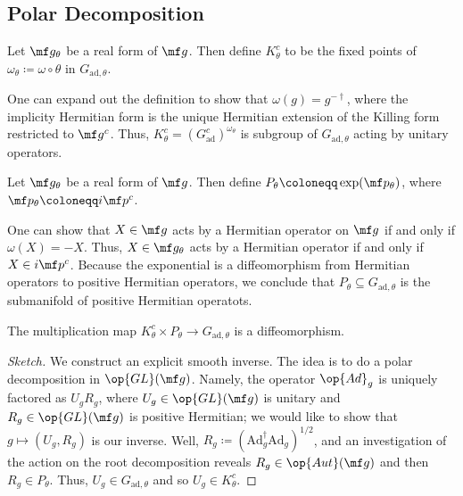 \documentclass{article}
\begin{document}
\subsection{Polar Decomposition}
\begin{definition}
	Let $\mf g_\theta$ be a real form of $\mf g$. Then define $K^c_\theta$ to be the fixed points of $\omega_\theta\coloneqq\omega\circ\theta$ in $G_{\mathrm{ad},\theta}$.
\end{definition}
\begin{remark}
	One can expand out the definition to show that $\omega(g)=g^{-\dagger}$, where the implicity Hermitian form is the unique Hermitian extension of the Killing form restricted to $\mf g^c$. Thus, $K^c_\theta=(G_{\mathrm{ad}}^c)^{\omega_\theta}$ is subgroup of $G_{\mathrm{ad},\theta}$ acting by unitary operators.
\end{remark}
\begin{definition}
	Let $\mf g_\theta$ be a real form of $\mf g$. Then define $P_\theta\coloneqq\exp(\mf p_\theta)$, where $\mf p_\theta\coloneqq i\mf p^c$.
\end{definition}
\begin{remark}
	One can show that $X\in\mf g$ acts by a Hermitian operator on $\mf g$ if and only if $\omega(X)=-X$. Thus, $X\in\mf g_\theta$ acts by a Hermitian operator if and only if $X\in i\mf p^c$. Because the exponential is a diffeomorphism from Hermitian operators to positive Hermitian operators, we conclude that $P_\theta\subseteq G_{\mathrm{ad},\theta}$ is the submanifold of positive Hermitian operatots.
\end{remark}
\begin{theorem}
	The multiplication map $K^c_\theta\times P_\theta\to G_{\mathrm{ad},\theta}$ is a diffeomorphism.
\end{theorem}
\begin{proof}[Sketch]
	We construct an explicit smooth inverse. The idea is to do a polar decomposition in $\op{GL}(\mf g)$. Namely, the operator $\op{Ad}_g$ is uniquely factored as $U_gR_g$, where $U_g\in\op{GL}(\mf g)$ is unitary and $R_g\in\op{GL}(\mf g)$ is positive Hermitian; we would like to show that $g\mapsto(U_g,R_g)$ is our inverse. Well, $R_g\coloneqq(\mathrm{Ad}_g^\dagger\mathrm{Ad}_g)^{1/2}$, and an investigation of the action on the root decomposition reveals $R_g\in\op{Aut}(\mf g)$ and then $R_g\in P_\theta$. Thus, $U_g\in G_{\mathrm{ad},\theta}$ and so $U_g\in K^c_\theta$.
\end{proof}
\end{document}
